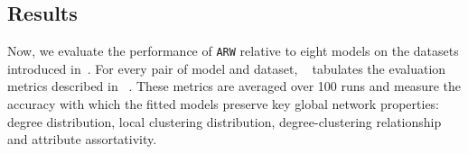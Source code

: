
\subsection{Results}
\label{sub:Experimental Results}

Now, we evaluate the performance of \texttt{ARW} relative to eight
models on the datasets introduced in~.
For every pair of model and dataset, ~ tabulates the evaluation metrics
described in ~.
These metrics are averaged over 100 runs and measure the accuracy with which the fitted models
preserve key global network properties: degree distribution, local clustering distribution,
degree-clustering relationship and attribute assortativity.


